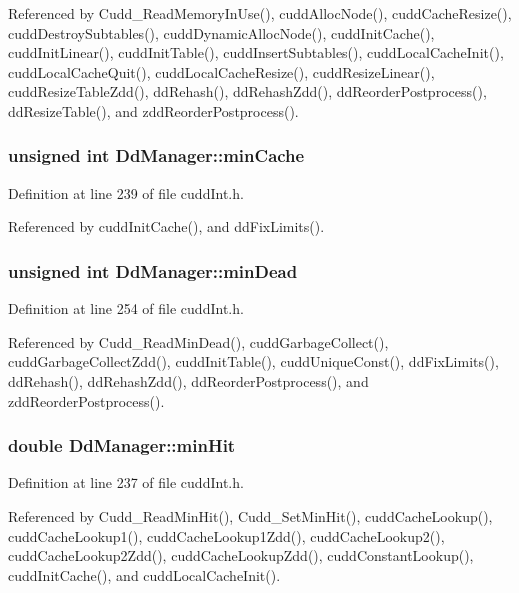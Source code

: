 Referenced by Cudd\_\-Read\-Memory\-In\-Use(), cudd\-Alloc\-Node(), cudd\-Cache\-Resize(), cudd\-Destroy\-Subtables(), cudd\-Dynamic\-Alloc\-Node(), cudd\-Init\-Cache(), cudd\-Init\-Linear(), cudd\-Init\-Table(), cudd\-Insert\-Subtables(), cudd\-Local\-Cache\-Init(), cudd\-Local\-Cache\-Quit(), cudd\-Local\-Cache\-Resize(), cudd\-Resize\-Linear(), cudd\-Resize\-Table\-Zdd(), dd\-Rehash(), dd\-Rehash\-Zdd(), dd\-Reorder\-Postprocess(), dd\-Resize\-Table(), and zdd\-Reorder\-Postprocess().
\subsubsection{\setlength{\rightskip}{0pt plus 5cm}unsigned int \bf{Dd\-Manager::min\-Cache}}\label{structDdManager_ee43ebf8d04c572e1816db625688db0b}




Definition at line 239 of file cudd\-Int.h.

Referenced by cudd\-Init\-Cache(), and dd\-Fix\-Limits().
\subsubsection{\setlength{\rightskip}{0pt plus 5cm}unsigned int \bf{Dd\-Manager::min\-Dead}}\label{structDdManager_6cd4e44cf6d9a86bf2f75c34c3e2254b}




Definition at line 254 of file cudd\-Int.h.

Referenced by Cudd\_\-Read\-Min\-Dead(), cudd\-Garbage\-Collect(), cudd\-Garbage\-Collect\-Zdd(), cudd\-Init\-Table(), cudd\-Unique\-Const(), dd\-Fix\-Limits(), dd\-Rehash(), dd\-Rehash\-Zdd(), dd\-Reorder\-Postprocess(), and zdd\-Reorder\-Postprocess().
\subsubsection{\setlength{\rightskip}{0pt plus 5cm}double \bf{Dd\-Manager::min\-Hit}}\label{structDdManager_6a9381bd220537413b68918593e83dae}




Definition at line 237 of file cudd\-Int.h.

Referenced by Cudd\_\-Read\-Min\-Hit(), Cudd\_\-Set\-Min\-Hit(), cudd\-Cache\-Lookup(), cudd\-Cache\-Lookup1(), cudd\-Cache\-Lookup1Zdd(), cudd\-Cache\-Lookup2(), cudd\-Cache\-Lookup2Zdd(), cudd\-Cache\-Lookup\-Zdd(), cudd\-Constant\-Lookup(), cudd\-Init\-Cache(), and cudd\-Local\-Cache\-Init().
